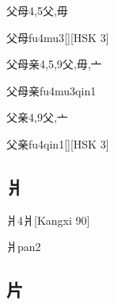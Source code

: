 \begin{Entry}{父母}{4,5}{⽗,⽏}
  \begin{Phonetics}{父母}{fu4mu3}[][HSK 3]
  \end{Phonetics}
\end{Entry}

\begin{Entry}{父母亲}{4,5,9}{⽗,⽏,⼇}
  \begin{Phonetics}{父母亲}{fu4mu3qin1}
  \end{Phonetics}
\end{Entry}

\begin{Entry}{父亲}{4,9}{⽗,⼇}
  \begin{Phonetics}{父亲}{fu4qin1}[][HSK 3]
  \end{Phonetics}
\end{Entry}

\subsection*{爿}

\begin{Entry}{爿}{4}{⽙}[Kangxi 90]
  \begin{Phonetics}{爿}{pan2}
  \end{Phonetics}
\end{Entry}

\subsection*{片}

